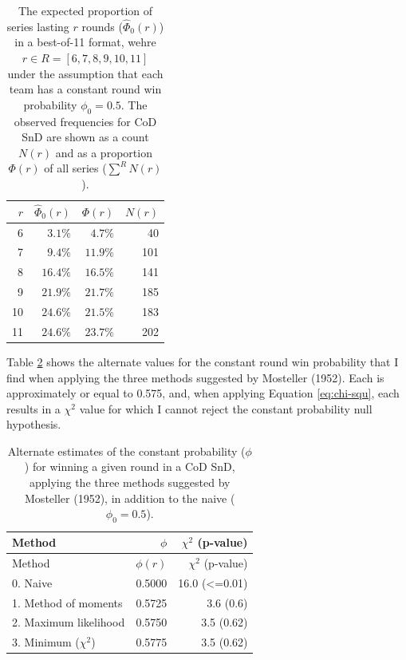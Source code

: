 \documentclass{article}
\begin{document}
\begin{longtable}{rrrr}
\caption{The expected proportion of series lasting $r$ rounds ($\hat{\Phi}_0(r)$) in a best-of-11 format, wehre $r \in R = [6, 7, 8, 9, 10, 11]$ under the assumption that each team has a constant round win probability $\phi_0 = 0.5$. The observed frequencies for CoD SnD are shown as a count $N(r)$ and as a proportion $\Phi(r)$ of all series ($\sum^R N(r)$).}\label{tbl:cod-prob-series-lasting-r-rounds} \\
\toprule
$r$ & $\hat{\Phi}_0(r)$ & $\Phi(r)$ & $N(r)$ \\ 
\midrule
6 & $3.1\%$ & $4.7\%$ & 40 \\ 
7 & $9.4\%$ & $11.9\%$ & 101 \\ 
8 & $16.4\%$ & $16.5\%$ & 141 \\ 
9 & $21.9\%$ & $21.7\%$ & 185 \\ 
10 & $24.6\%$ & $21.5\%$ & 183 \\ 
11 & $24.6\%$ & $23.7\%$ & 202 \\ 
\bottomrule
\end{longtable}

Table \ref{tbl:mosteller-methods-results} shows the alternate values for
the constant round win probability that I find when applying the three
methods suggested by Mosteller (1952). Each is approximately or equal to
0.575, and, when applying Equation \ref{eq:chi-squ}, each results in a
\(\chi^2\) value for which I cannot reject the constant probability null
hypothesis.

\begin{longtable}[]{@{}lrr@{}}
\caption{Alternate estimates of the constant probability ($\phi$) for winning a given round in a CoD SnD, applying the three methods suggested by Mosteller (1952), in addition to the naive ($\phi_0 = 0.5$).}\label{tbl:mosteller-methods-results} \\
\toprule()
Method & $\phi$ & $\chi^2$ (p-value) \\
\midrule()
\endfirsthead
\toprule()
Method & $\phi(r)$ & $\chi^2$ (p-value) \\
\midrule()
\endhead
0. Naive & 0.5000 & 16.0 (\textless=0.01) \\
1. Method of moments & 0.5725 & 3.6 (0.6) \\
2. Maximum likelihood & 0.5750 & 3.5 (0.62) \\
3. Minimum ($\chi^2$) & 0.5775 & 3.5 (0.62) \\
\bottomrule()
\end{longtable}
\end{document}
